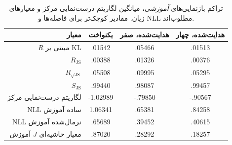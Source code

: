 \begin{table}[htbp]
\centering\small
\caption{تراکم بازنمایی‌های \emph{آموزشی}، میانگین لگاریتم درست‌نمایی مرکز و معیارهای زیان. مقادیر کوچک‌تر برای فاصله‌ها و NLL مطلوب‌اند.}
\label{tab:ch4-center-observation-within}
\begin{tabular}{rccc}\hline
معیار & یکنواخت & هدایت‌شده، صفر & هدایت‌شده، چهار\\\hline
$R$ مبتنی بر KL & .01542 & .05466 & .01513\\
$R_{\mathrm{JS}}$ & .00388 & .01326 & .00376\\
$R_{\sqrt{\mathrm{JS}}}$ & .05508 & .09995 & .05295\\
$S_{\mathrm{JS}}$ & .99440 & .98087 & .99457\\
لگاریتم درست‌نمایی مرکز & -1.02989 & -.79850 & -.90567\\
NLL ساده آموزش & 1.06341 & .65381 & .84258\\
NLL نرمال‌شده آموزش & .65689 & .39452 & .40615\\
معیار حاشیه‌ای $J$ آموزش & .87020 & .28292 & .18257\\\hline
\end{tabular}
\end{table}
